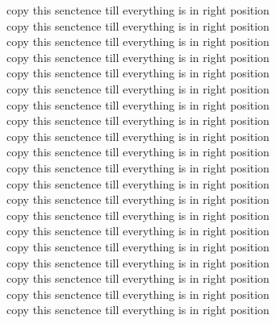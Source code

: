 \documentclass{article}
\begin{document}
copy this senctence till everything is in right position\\
copy this senctence till everything is in right position\\
copy this senctence till everything is in right position\\
copy this senctence till everything is in right position\\
copy this senctence till everything is in right position\\
copy this senctence till everything is in right position\\
copy this senctence till everything is in right position\\
copy this senctence till everything is in right position\\
copy this senctence till everything is in right position\\
copy this senctence till everything is in right position\\
copy this senctence till everything is in right position\\
copy this senctence till everything is in right position\\
copy this senctence till everything is in right position\\
copy this senctence till everything is in right position\\
copy this senctence till everything is in right position\\
copy this senctence till everything is in right position\\
copy this senctence till everything is in right position\\
copy this senctence till everything is in right position\\
copy this senctence till everything is in right position\\
copy this senctence till everything is in right position\\
\end{document}
